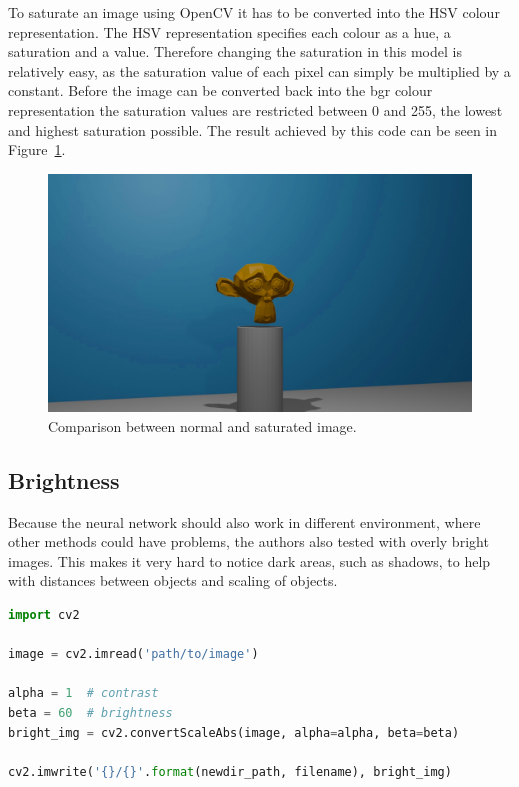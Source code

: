 To saturate an image using OpenCV it has to be converted into the HSV colour representation. The HSV representation specifies each colour as a hue, a saturation and a value. Therefore changing the saturation in this model is relatively easy, as the saturation value of each pixel can simply be multiplied by a constant. Before the image can be converted back into the bgr colour representation the saturation values are restricted between 0 and 255, the lowest and highest saturation possible. The result achieved by this code can be seen in Figure~\ref{pic:implementation_opencv_saturated}.

\begin{figure}[h!]
	\centering
	\includegraphics[width=4.5in]{img/implementation_opencv_saturated.jpg}
	\caption{Comparison between normal and saturated image.}
	\label{pic:implementation_opencv_saturated}
\end{figure}

\subsection{Brightness}
Because the neural network should also work in different environment, where other methods could have problems, the authors also tested with overly bright images. This makes it very hard to notice dark areas, such as shadows, to help with distances between objects and scaling of objects.

\begin{lstlisting}[language=python]
import cv2

image = cv2.imread('path/to/image')

alpha = 1  # contrast
beta = 60  # brightness
bright_img = cv2.convertScaleAbs(image, alpha=alpha, beta=beta)

cv2.imwrite('{}/{}'.format(newdir_path, filename), bright_img)
\end{lstlisting}

